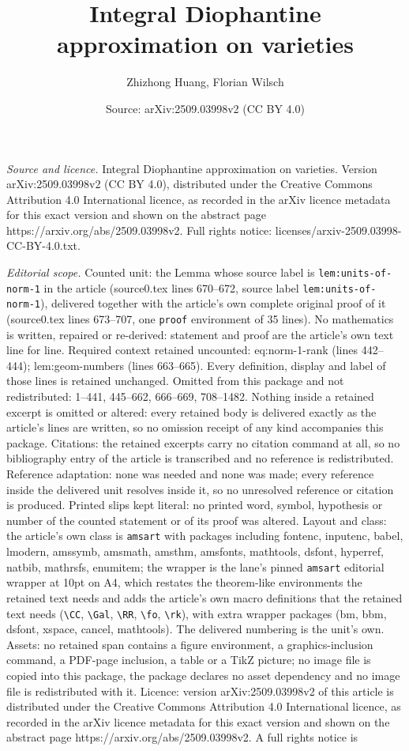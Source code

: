 \documentclass[10pt,a4paper]{amsart}
\title[Integral Diophantine approximation on varieties]{Integral Diophantine approximation on varieties}
\author{Zhizhong Huang, Florian Wilsch}
\date{Source: arXiv:2509.03998v2 (CC BY 4.0)}
\begin{document}
\maketitle

\noindent\emph{Source and licence.} Integral Diophantine approximation on varieties. Version arXiv:2509.03998v2 (CC BY 4.0), distributed under the Creative Commons Attribution 4.0 International licence, as recorded in the arXiv licence metadata for this exact version and shown on the abstract page https://arxiv.org/abs/2509.03998v2. Full rights notice: licenses/arxiv-2509.03998-CC-BY-4.0.txt.\par\smallskip

\noindent\textit{Editorial scope.} Counted unit: the Lemma whose source label is \texttt{lem:units-of-norm-1} in the article (source0.tex lines 670--672, source label \texttt{lem:units-of-norm-1}), delivered together with the article's own complete original proof of it (source0.tex lines 673--707, one \texttt{proof} environment of 35 lines). No mathematics is written, repaired or re-derived: statement and proof are the article's own text line for line. Required context retained uncounted: eq:norm-1-rank (lines 442--444); lem:geom-numbers (lines 663--665). Every definition, display and label of those lines is retained unchanged. Omitted from this package and not redistributed: 1--441, 445--662, 666--669, 708--1482. Nothing inside a retained excerpt is omitted or altered: every retained body is delivered exactly as the article's lines are written, so no omission receipt of any kind accompanies this package. Citations: the retained excerpts carry no citation command at all, so no bibliography entry of the article is transcribed and no reference is redistributed. Reference adaptation: none was needed and none was made; every reference inside the delivered unit resolves inside it, so no unresolved reference or citation is produced. Printed slips kept literal: no printed word, symbol, hypothesis or number of the counted statement or of its proof was altered. Layout and class: the article's own class is \texttt{amsart} with packages including fontenc, inputenc, babel, lmodern, amssymb, amsmath, amsthm, amsfonts, mathtools, dsfont, hyperref, natbib, mathrsfs, enumitem; the wrapper is the lane's pinned \texttt{amsart} editorial wrapper at 10pt on A4, which restates the theorem-like environments the retained text needs and adds the article's own macro definitions that the retained text needs (\texttt{\textbackslash CC}, \texttt{\textbackslash Gal}, \texttt{\textbackslash RR}, \texttt{\textbackslash fo}, \texttt{\textbackslash rk}), with extra wrapper packages (bm, bbm, dsfont, xspace, cancel, mathtools). The delivered numbering is the unit's own. Assets: no retained span contains a figure environment, a graphics-inclusion command, a PDF-page inclusion, a table or a TikZ picture; no image file is copied into this package, the package declares no asset dependency and no image file is redistributed with it. Licence: version arXiv:2509.03998v2 of this article is distributed under the Creative Commons Attribution 4.0 International licence, as recorded in the arXiv licence metadata for this exact version and shown on the abstract page https://arxiv.org/abs/2509.03998v2. A full rights notice is 
\end{document}
